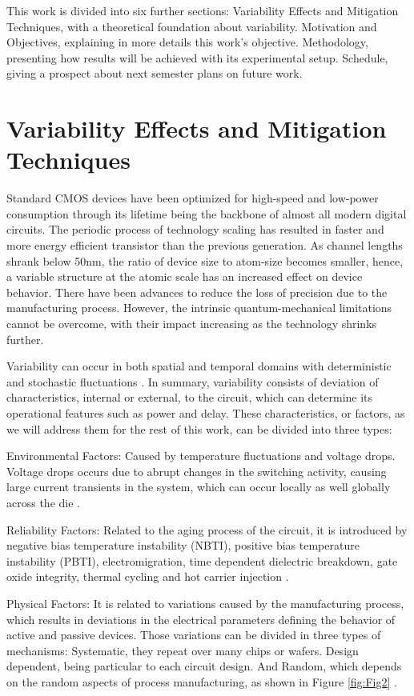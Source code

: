 \documentclass[ecp,tc, english]{iiufrgs}
\begin{document}
This work is divided into six further sections: Variability Effects and Mitigation Techniques, with a theoretical foundation about variability. Motivation and Objectives, explaining in more details this work’s objective. Methodology, presenting how results will be achieved with its experimental setup. Schedule, giving a prospect about next semester plans on future work. 

\chapter{Variability Effects and Mitigation Techniques}

Standard CMOS devices have been optimized for high-speed and low-power consumption through its lifetime being the backbone of almost all modern digital circuits. The periodic process of technology scaling has resulted in faster and more energy efficient transistor than the previous generation. As channel lengths shrank below 50nm, the ratio of device size to atom-size becomes smaller, hence, a variable structure at the atomic scale has an increased effect on device behavior. There have been advances to reduce the loss of precision due to the manufacturing process. However, the intrinsic quantum-mechanical limitations cannot be overcome, with their impact increasing as the technology shrinks further. 

Variability can occur in both spatial and temporal domains with deterministic and stochastic fluctuations \cite{walker2010optimizing}. In summary, variability consists of deviation of characteristics, internal or external, to the circuit, which can determine its operational features such as power and delay. These characteristics, or factors, as we will address them for the rest of this work, can be divided into three types: 
 
Environmental Factors:  
Caused by temperature fluctuations and voltage drops. Voltage drops occurs due to abrupt changes in the switching activity, causing large current transients in the system, which can occur locally as well globally across the die \cite{nassif:08}. 
 
Reliability Factors: 
Related to the aging process of the circuit, it is introduced by negative bias temperature instability (NBTI), positive bias temperature instability (PBTI), electromigration, time dependent dielectric breakdown, gate oxide integrity, thermal cycling and hot carrier injection \cite{nassif:08}.
 
Physical Factors:
It is related to variations caused by the manufacturing process, which results in deviations in the electrical parameters defining the behavior of active and passive devices. Those variations can be divided in three types of mechanisms: Systematic, they repeat over many chips or wafers. Design dependent, being particular to each circuit design. And Random, which depends on the random aspects of process manufacturing, as shown in Figure \ref{fig:Fig2} \cite{nassif:08}.
\end{document}
